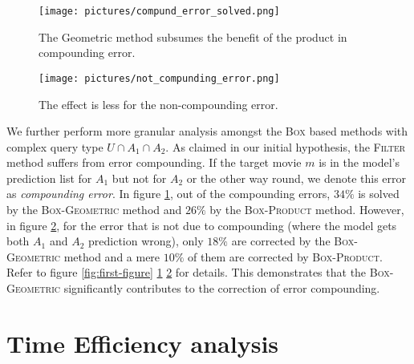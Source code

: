 \begin{figure}[ht!]
    \centering
    \texttt{[image: pictures/compund\_error\_solved.png]}
    \caption{The Geometric method subsumes the benefit of the product in compounding error.}
    \label{fig:second-figure}
\end{figure}

\begin{figure}[ht!]
    \centering
    \texttt{[image: pictures/not\_compunding\_error.png]}
    \caption{The effect is less for the non-compounding error.}
    \label{fig:third-figure}
\end{figure}

We further perform more granular analysis amongst the \textsc{Box} based methods with complex query type $U \cap A_1 \cap A_2$. As claimed in our initial hypothesis, the \textsc{Filter} method suffers from error compounding. If the target movie $m$ is in the model's prediction list for $A_1$ but not for $A_2$ or the other way round, we denote this error as \textit{compounding error}. In figure \ref{fig:second-figure}, out of the compounding errors, $34 \%$ is solved by the \textsc{Box-Geometric} method and $26 \%$ by the \textsc{Box-Product} method. However, in figure \ref{fig:third-figure}, for the error that is not due to compounding (where the model gets both $A_1$ and $A_2$ prediction wrong), only $18 \%$ are corrected by the \textsc{Box-Geometric} method and a mere $10 \%$ of them are corrected by \textsc{Box-Product}. Refer to figure \ref{fig:first-figure} \ref{fig:second-figure} \ref{fig:third-figure} for details. This demonstrates that the \textsc{Box-Geometric} significantly contributes to the correction of error compounding.


\section{{Time Efficiency analysis}}

